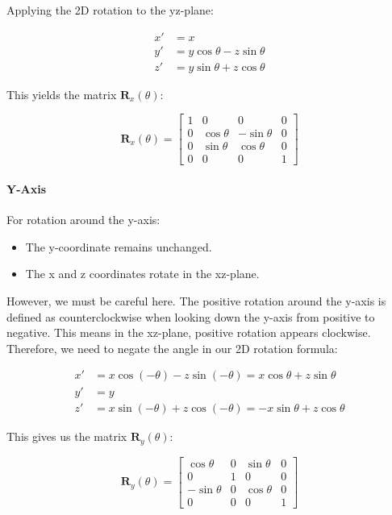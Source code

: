 \documentclass[12pt]{article}
\begin{document}
Applying the 2D rotation to the yz-plane:

$$
    \begin{aligned}
        x' & = x                           \\
        y' & = y \cos\theta - z \sin\theta \\
        z' & = y \sin\theta + z \cos\theta
    \end{aligned}
$$

This yields the matrix $\mathbf{R}_x(\theta)$:

$$
    \mathbf{R}_x(\theta) = \begin{bmatrix}
        1 & 0          & 0           & 0 \\
        0 & \cos\theta & -\sin\theta & 0 \\
        0 & \sin\theta & \cos\theta  & 0 \\
        0 & 0          & 0           & 1
    \end{bmatrix}
$$


\paragraph{Y-Axis} For rotation around the y-axis:
\begin{itemize}
    \item The y-coordinate remains unchanged.
    \item The x and z coordinates rotate in the xz-plane.
\end{itemize}

However, we must be careful here. The positive rotation around the y-axis is defined as counterclockwise when looking down the y-axis from positive to negative. This means in the xz-plane, positive rotation appears clockwise. Therefore, we need to negate the angle in our 2D rotation formula:

$$
    \begin{aligned}
        x' & = x \cos(-\theta) - z \sin(-\theta) = x \cos\theta + z \sin\theta  \\
        y' & = y                                                                \\
        z' & = x \sin(-\theta) + z \cos(-\theta) = -x \sin\theta + z \cos\theta
    \end{aligned}
$$

This gives us the matrix $\mathbf{R}_y(\theta)$:

$$
    \mathbf{R}_y(\theta) = \begin{bmatrix}
        \cos\theta  & 0 & \sin\theta & 0 \\
        0           & 1 & 0          & 0 \\
        -\sin\theta & 0 & \cos\theta & 0 \\
        0           & 0 & 0          & 1
    \end{bmatrix}
$$
\end{document}
